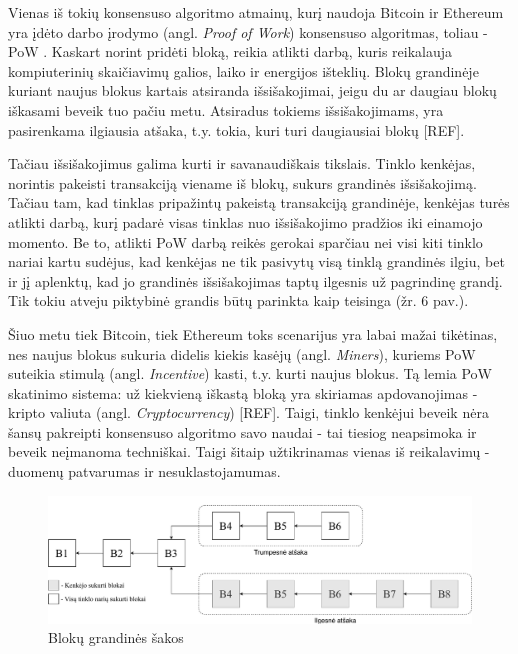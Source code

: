 Vienas iš tokių konsensuso algoritmo atmainų, kurį naudoja Bitcoin ir Ethereum yra įdėto darbo įrodymo (angl. \textit{Proof of Work}) konsensuso algoritmas, toliau - PoW \cite{gervais2016security}. Kaskart norint pridėti bloką, reikia atlikti darbą, kuris reikalauja kompiuterinių skaičiavimų galios, laiko ir energijos išteklių. Blokų grandinėje kuriant naujus blokus kartais atsiranda išsišakojimai, jeigu du ar daugiau blokų iškasami beveik tuo pačiu metu. Atsiradus tokiems išsišakojimams, yra pasirenkama ilgiausia atšaka, t.y. tokia, kuri turi daugiausiai blokų [REF]. 

Tačiau išsišakojimus galima kurti ir savanaudiškais tikslais. Tinklo kenkėjas, norintis pakeisti transakciją viename iš blokų, sukurs grandinės išsišakojimą. Tačiau tam, kad tinklas pripažintų pakeistą transakciją grandinėje, kenkėjas turės atlikti darbą, kurį padarė visas tinklas nuo išsišakojimo pradžios iki einamojo momento. Be to, atlikti PoW darbą reikės gerokai sparčiau nei visi kiti tinklo nariai kartu sudėjus, kad kenkėjas ne tik pasivytų visą tinklą grandinės ilgiu, bet ir jį aplenktų, kad jo grandinės išsišakojimas taptų ilgesnis už pagrindinę grandį. Tik tokiu atveju piktybinė grandis būtų parinkta kaip teisinga (žr. 6 pav.).

Šiuo metu tiek Bitcoin, tiek Ethereum toks scenarijus yra labai mažai tikėtinas, nes naujus blokus sukuria didelis kiekis kasėjų (angl. \textit{Miners}), kuriems PoW suteikia stimulą (angl. \textit{Incentive}) kasti, t.y. kurti naujus blokus. Tą lemia PoW skatinimo sistema: už kiekvieną iškastą bloką yra skiriamas apdovanojimas - kripto valiuta (angl. \textit{Cryptocurrency}) [REF]. Taigi, tinklo kenkėjui beveik nėra šansų pakreipti konsensuso algoritmo savo naudai - tai tiesiog neapsimoka ir beveik neįmanoma techniškai. Taigi šitaip užtikrinamas vienas iš reikalavimų - duomenų patvarumas ir nesuklastojamumas.

\begin{figure}[H]
    \centering
    \includegraphics[scale=0.5]{images/blockchain-branches}
    \caption{Blokų grandinės šakos}
\end{figure}

